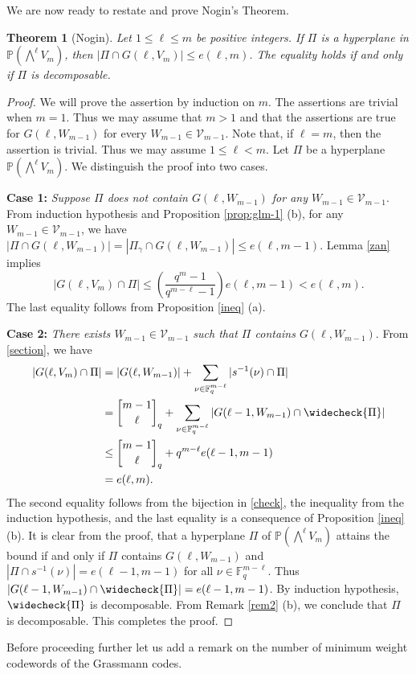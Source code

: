 \documentclass[10pt,a4paper,oneside]{amsproc}
\newtheorem{theorem}{Theorem}[section]
\newcommand{\Fq}{\mathbb{F}_q}
\def\Fq{{\mathbb F}_q}
\def\PP{{\mathbb P}}
\newcommand{\V}{{\mathcal{V}}}
\begin{document}
We are now ready to restate and prove Nogin's Theorem. 
\begin{theorem}[Nogin] \cite[Theorem 2]{N} \label{main}
Let $1 \le \ell \le m$ be positive integers. If $\Pi$ is a hyperplane in $\PP(\bigwedge^{\ell} V_m)$, then 
$|\Pi \cap G(\ell, V_m)| \le e(\ell, m)$. 
The equality holds if and only if  $\Pi$ is decomposable. 
\end{theorem}


\begin{proof}
    We will prove the assertion by induction on $m$. The assertions are trivial when $m = 1$. Thus we may assume that $m > 1$ and that the assertions are true for $G(\ell, W_{m-1})$ for every $W_{m-1} \in \V_{m-1}$.
    Note that, if $\ell = m$, then the assertion is trivial. Thus we may assume $1 \le \ell < m$. Let $\Pi$ be a hyperplane $\PP(\bigwedge^{\ell} V_m)$. We distinguish the proof into two cases. 

    \textbf{Case 1:} \emph{Suppose $\Pi$ does not contain $G(\ell, W_{m-1})$ for any $W_{m-1} \in \V_{m-1}$}. From induction hypothesis and Proposition \ref{prop:glm-1} (b), for any $W_{m-1} \in \V_{m-1}$, we have $|\Pi \cap G(\ell, W_{m-1})| = |\Pi_\gamma \cap G(\ell, W_{m-1})| \le e(\ell, m-1)$.
    Lemma \ref{zan} implies
    \begin{equation}
        |G(\ell, V_m) \cap \Pi| \le \left(\frac{q^m - 1}{q^{m-\ell} - 1} \right) e(\ell, m-1) < e(\ell, m) .
    \end{equation}
    The last equality follows from Proposition \ref{ineq} (a). 

    \textbf{Case 2:} \emph{There exists  $W_{m-1} \in \V_{m-1}$ such that $\Pi$ contains $G(\ell, W_{m-1})$}. From \eqref{section}, we have
    \begin{align*}
        |G(\ell, V_m) \cap \Pi| &= |G(\ell, W_{m-1})| + \sum_{\nu \in \Fq^{m-\ell}} |s^{-1} (\nu) \cap \Pi| \\
        & = {m - 1 \brack \ell}_q + \sum_{\nu \in \Fq^{m-\ell}} |G(\ell - 1, W_{m-1}) \cap \widecheck{\Pi}| \\
        & \le {m - 1 \brack \ell}_q + q^{m - \ell}e (\ell - 1, m-1) \\
       &=  e (\ell, m). 
    \end{align*}
 The second equality follows from the bijection in \eqref{check}, the inequality from the induction hypothesis, and the last equality is a consequence of Proposition \ref{ineq} (b).  It is clear from the proof, that a hyperplane $\Pi$ of $\PP (\bigwedge^{\ell} V_m)$ attains the bound if and only if $\Pi$ contains $G(\ell, W_{m-1})$ and $|\Pi \cap s^{-1} (\nu)| = e(\ell - 1, m-1)$ for all $\nu \in \Fq^{m-\ell}$. Thus $|G(\ell - 1, W_{m-1}) \cap \widecheck{\Pi}| = e(\ell - 1, m-1)$. By induction hypothesis, $\widecheck{\Pi}$ is decomposable. From Remark \ref{rem2} (b), we conclude that $\Pi$ is decomposable. This completes the proof. 
\end{proof}
Before proceeding further let us add a remark on the number of minimum weight codewords of the Grassmann codes. 
\end{document}
